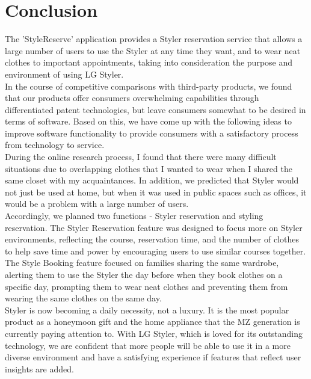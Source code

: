 \documentclass[conference]{IEEEtran}
\begin{document}
\section{Conclusion}
The 'StyleReserve' application provides a Styler reservation service that allows a large number of users to use the Styler at any time they want, and to wear neat clothes to important appointments, taking into consideration the purpose and environment of using LG Styler.\\
In the course of competitive comparisons with third-party products, we found that our products offer consumers overwhelming capabilities through differentiated patent technologies, but leave consumers somewhat to be desired in terms of software. Based on this, we have come up with the following ideas to improve software functionality to provide consumers with a satisfactory process from technology to service.\\
During the online research process, I found that there were many difficult situations due to overlapping clothes that I wanted to wear when I shared the same closet with my acquaintances. In addition, we predicted that Styler would not just be used at home, but when it was used in public spaces such as offices, it would be a problem with a large number of users.\\
Accordingly, we planned two functions - Styler reservation and styling reservation. The Styler Reservation feature was designed to focus more on Styler environments, reflecting the course, reservation time, and the number of clothes to help save time and power by encouraging users to use similar courses together. The Style Booking feature focused on families sharing the same wardrobe, alerting them to use the Styler the day before when they book clothes on a specific day, prompting them to wear neat clothes and preventing them from wearing the same clothes on the same day.\\
Styler is now becoming a daily necessity, not a luxury. It is the most popular product as a honeymoon gift and the home appliance that the MZ generation is currently paying attention to. With LG Styler, which is loved for its outstanding technology, we are confident that more people will be able to use it in a more diverse environment and have a satisfying experience if features that reflect user insights are added.\\
\end{document}
